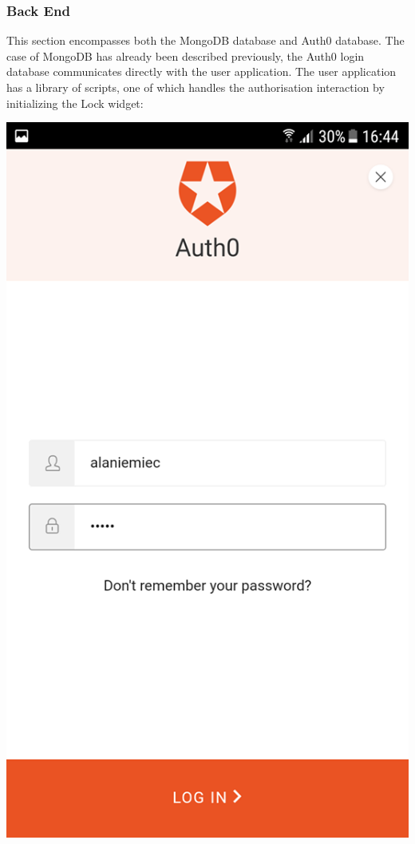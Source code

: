 \subsubsection{Back End}
    This section encompasses both the MongoDB database and Auth0 database. The case of MongoDB has already been described previously, the Auth0 login database communicates directly with the user application. 
    The user application has a library of scripts, one of which handles the authorisation interaction by initializing the Lock widget:
\begin{center}    
\includegraphics[scale=0.5]{img/2authlogindetails.png}
\end{center}
